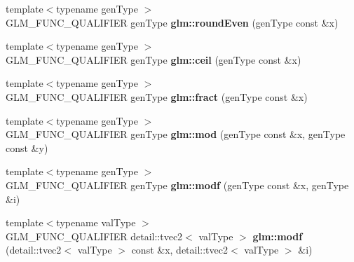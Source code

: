 \begin{DoxyCompactItemize}
\item 
\hypertarget{namespaceglm_ad361f8a0435425795bef8d6464473d8b}{{\footnotesize template$<$typename gen\-Type $>$ }\\\-G\-L\-M\-\_\-\-F\-U\-N\-C\-\_\-\-Q\-U\-A\-L\-I\-F\-I\-E\-R gen\-Type {\bfseries glm\-::round\-Even} (gen\-Type const \&x)}\label{namespaceglm_ad361f8a0435425795bef8d6464473d8b}

\item 
\hypertarget{namespaceglm_aa071f8757c1234068acac0b88e1f86d0}{{\footnotesize template$<$typename gen\-Type $>$ }\\\-G\-L\-M\-\_\-\-F\-U\-N\-C\-\_\-\-Q\-U\-A\-L\-I\-F\-I\-E\-R gen\-Type {\bfseries glm\-::ceil} (gen\-Type const \&x)}\label{namespaceglm_aa071f8757c1234068acac0b88e1f86d0}

\item 
\hypertarget{namespaceglm_a73da95304ae8ecfe37daabcf692590d2}{{\footnotesize template$<$typename gen\-Type $>$ }\\\-G\-L\-M\-\_\-\-F\-U\-N\-C\-\_\-\-Q\-U\-A\-L\-I\-F\-I\-E\-R gen\-Type {\bfseries glm\-::fract} (gen\-Type const \&x)}\label{namespaceglm_a73da95304ae8ecfe37daabcf692590d2}

\item 
\hypertarget{namespaceglm_a06357000eb6bbade32a6a0f9574f181c}{{\footnotesize template$<$typename gen\-Type $>$ }\\\-G\-L\-M\-\_\-\-F\-U\-N\-C\-\_\-\-Q\-U\-A\-L\-I\-F\-I\-E\-R gen\-Type {\bfseries glm\-::mod} (gen\-Type const \&x, gen\-Type const \&y)}\label{namespaceglm_a06357000eb6bbade32a6a0f9574f181c}

\item 
\hypertarget{namespaceglm_a7d0d639e4ef58273c73474d3e06c300b}{{\footnotesize template$<$typename gen\-Type $>$ }\\\-G\-L\-M\-\_\-\-F\-U\-N\-C\-\_\-\-Q\-U\-A\-L\-I\-F\-I\-E\-R gen\-Type {\bfseries glm\-::modf} (gen\-Type const \&x, gen\-Type \&i)}\label{namespaceglm_a7d0d639e4ef58273c73474d3e06c300b}

\item 
\hypertarget{namespaceglm_a543475fad30f0ae13c4953345d2c857e}{{\footnotesize template$<$typename val\-Type $>$ }\\\-G\-L\-M\-\_\-\-F\-U\-N\-C\-\_\-\-Q\-U\-A\-L\-I\-F\-I\-E\-R \*
detail\-::tvec2$<$ val\-Type $>$ {\bfseries glm\-::modf} (detail\-::tvec2$<$ val\-Type $>$ const \&x, detail\-::tvec2$<$ val\-Type $>$ \&i)}\label{namespaceglm_a543475fad30f0ae13c4953345d2c857e}


\end{DoxyCompactItemize}
